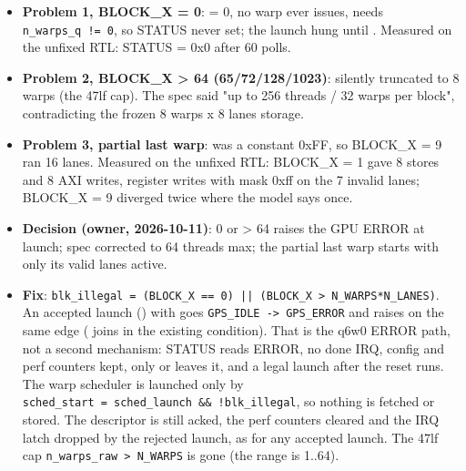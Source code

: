 \begin{record}

\begin{itemize}
\tightlist
\item
  \textbf{Problem 1, BLOCK\_X = 0}:  = 0, no warp ever
  issues,  needs
  \texttt{n\_\allowbreak{}warps\_\allowbreak{}q\ !=\allowbreak{}\ 0}, so
  STATUS never set; the launch hung until . Measured on
  the unfixed RTL: STATUS = 0x0 after 60 polls.
\item
  \textbf{Problem 2, BLOCK\_X \textgreater{} 64
  (65/\allowbreak{}72/\allowbreak{}128/\allowbreak{}1023)}: silently
  truncated to 8 warps (the 47lf cap). The spec said "up to 256 threads
  / 32 warps per block", contradicting the frozen 8 warps x 8 lanes
  storage.
\item
  \textbf{Problem 3, partial last warp}:  was a
  constant 0xFF, so BLOCK\_X = 9 ran 16 lanes. Measured on the unfixed
  RTL: BLOCK\_X = 1 gave 8 stores and 8 AXI writes, register writes with
  mask 0xff on the 7 invalid lanes; BLOCK\_X = 9 diverged twice where
  the model says once.
\item
  \textbf{Decision (owner, 2026-10-11)}: 0 or \textgreater{} 64 raises
  the GPU ERROR at launch; spec corrected to 64 threads max; the partial
  last warp starts with only its valid lanes active.
\item
  \textbf{Fix}:
  \texttt{blk\_\allowbreak{}illegal\ =\allowbreak{}\ (BLOCK\_\allowbreak{}X\ =\allowbreak{}=\allowbreak{}\ 0)\ ||\ (BLOCK\_\allowbreak{}X\ >\ N\_\allowbreak{}WARPS*N\_\allowbreak{}LANES)}.
  An accepted launch () with  goes
  \texttt{GPS\_\allowbreak{}IDLE\ -\allowbreak{}>\ GPS\_\allowbreak{}ERROR}
  and raises  on the same edge ( joins
   in the existing  condition). That is
  the q6w0 ERROR path, not a second mechanism: STATUS reads ERROR, no
  done IRQ, config and perf counters kept, only  or
   leaves it, and a legal launch after the reset runs. The
  warp scheduler is launched only by
  \texttt{sched\_\allowbreak{}start\ =\allowbreak{}\ sched\_\allowbreak{}launch\ \&\&\ !blk\_\allowbreak{}illegal},
  so nothing is fetched or stored. The descriptor is still acked, the
  perf counters cleared and the IRQ latch dropped by the rejected
  launch, as for any accepted launch. The 47lf cap
  \texttt{n\_\allowbreak{}warps\_\allowbreak{}raw\ >\ N\_\allowbreak{}WARPS}
  is gone (the range is 1..64).

\end{itemize}
\end{record}
